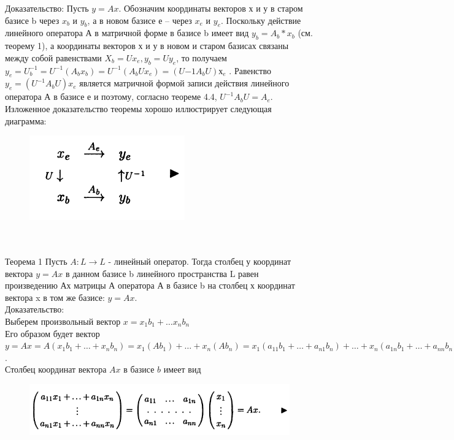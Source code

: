 \documentclass[12pt, oneside]{book}
\theoremstyle{definition}
\begin{document}
\begin{enumerate}
Доказательство:
Пусть $y=Ax$. Обозначим координаты векторов х и у в старом базисе b через $x_b$ и $y_b$, а в новом базисе е – через $x_e$ и $y_e$. Поскольку действие линейного оператора А в матричной форме в базисе b имеет вид $y_b = A_b*x_b$ (см. теорему 1), 
а координаты векторов х и у в новом и старом базисах связаны между собой равенствами
$X_b = Ux_e, y_b = Uy_e$,
то получаем
$y_e = U^{-1}_b= U^{-1}(A_bx_b) = U^{-1}(A_bUx_e) = (U{-1}A_bU)х_e$ .
Равенство $y_e = (U^{-1}A_bU) x_e$ является матричной формой записи действия линейного оператора А в базисе е и поэтому, согласно теореме 4.4, $U^{-1}A_bU = A_e$.
Изложенное доказательство теоремы хорошо иллюстрирует следующая диаграмма:
\begin{figure}[h!]
\centering
\includegraphics[scale=0.8]{16-1.PNG}
\end{figure}\\
\\
Теорема 1
Пусть $A: L \rightarrow L$ - линейный оператор. Тогда столбец у координат вектора $y=Ax$ в данном базисе b линейного пространства L равен произведению Ах матрицы А оператора А в базисе b на столбец х координат вектора x в том же базисе: $y=Ax$.\\
Доказательство:\\
Выберем произвольный вектор $x = x_1b_1 + … x_nb_n$\\
Его образом будет вектор \\
$y=Ax=A(x_1b_1 + … + x_nb_n) = x_1(Ab_1) + … + x_n(Ab_n) = x_1(a_{11}b_1 + … + a_{n1}b_n) + … + x_n(a_{1n}b_1 + … + a_{nn}b_n) = (a_{11}x_1 + … + a_{1n}x_n)b_1 + … + (a_{n1}x_1 + … + a_{nn}x_{n})b_n$.\\
Столбец координат вектора $Ax$ в базисе $b$ имеет вид\\
\begin{figure}[h!]
\centering
\includegraphics[scale=0.6]{16-2.PNG}
\end{figure}\\


\end{enumerate}
\end{document}
